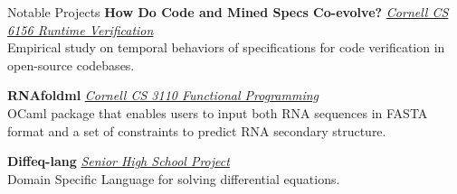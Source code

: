  
\begin{rSection}{Notable Projects}
	\textbf{How Do Code and Mined Specs Co-evolve?} \href{https://github.com/zwt299/spec-miners}{\textit{Cornell CS 6156 Runtime Verification} \ExternalLink} \\
	Empirical study on temporal behaviors of specifications for code verification in open-source codebases.

	\textbf{RNAfoldml} \href{https://github.com/jpVinnie/RNAfoldml/}{\textit{Cornell CS 3110 Functional Programming} \ExternalLink} \\
	OCaml package that enables users to input both RNA sequences in FASTA format and a set of constraints to predict RNA secondary structure.

	\textbf{Diffeq-lang} \href{https://github.com/jpVinnie/diffeq-lang/}{\textit{Senior High School Project} \ExternalLink} \\
	Domain Specific Language for solving differential equations.

\end{rSection}